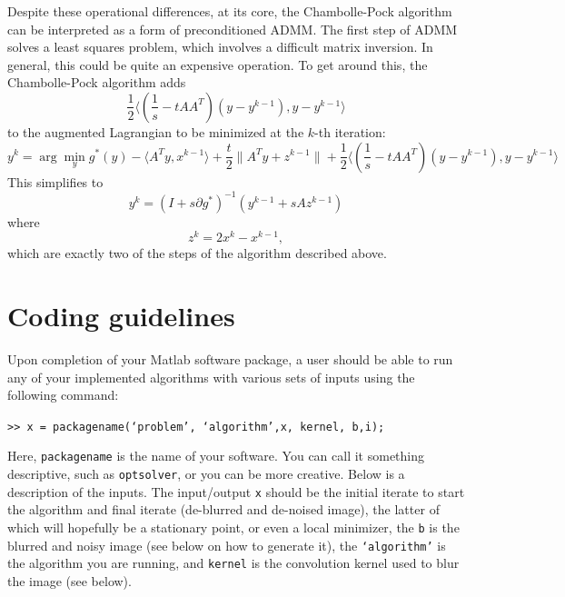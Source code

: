 \documentclass[12pt]{article}
\begin{document}
Despite these operational differences, at its core, the Chambolle-Pock algorithm can be interpreted as a form of preconditioned ADMM. The first step of ADMM solves a least squares problem, which involves a difficult matrix inversion. In general, this could be quite an expensive operation. To get around this, the Chambolle-Pock algorithm  adds 
\[ \frac{1}{2}\langle \left(\frac{1}{s} - t AA^T\right)(y - y^{k-1}), y - y^{k-1} \rangle \]
to the augmented Lagrangian to be minimized at the $k$-th iteration: 
\[ y^{k} = \arg \min_{y} g^{*}(y) - \langle A^Ty, x^{k-1} \rangle + \frac{t}{2}\|A^{T}y + z^{k-1} \| + \frac{1}{2}\langle (\frac{1}{s} - t AA^T)(y - y^{k-1}), y  - y^{k-1} \rangle \]
This simplifies to 
\[ y^{k}  = (I + s\partial g^*)^{-1}(y^{k-1} + sAz^{k-1}) \]
where 
\[ z^k = 2x^k - x^{k-1}, \]
which are exactly two of the steps of the algorithm described above. 


\section{Coding guidelines}

Upon completion of your Matlab software package, a user should be able to run any of your implemented algorithms with various sets of inputs using the following command:

\begin{center}
\texttt{>> x = packagename(`problem', `algorithm',x, kernel, b,i);}
\end{center}

\noindent
Here, \texttt{packagename} is the name of your software.  You can call it something descriptive, such as \texttt{optsolver}, or you can be more creative.  Below is a description of the inputs.  The input/output \texttt{x} should be the initial iterate to start the algorithm and final iterate (de-blurred and de-noised image), the latter of which will hopefully be a stationary point, or even a local minimizer, the \texttt{b} is the blurred and noisy image (see below on how to generate it), the \texttt{`algorithm'} is the algorithm you are running, and \texttt{kernel} is the convolution kernel used to blur the image (see below). 
\end{document}
